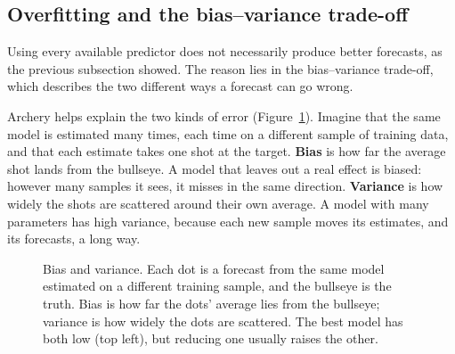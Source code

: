 \subsection{Overfitting and the bias--variance trade-off}
\label{sec:20-biasvar}

Using every available predictor does not necessarily produce better forecasts, as the previous subsection showed. The reason lies in the bias--variance trade-off, which describes the two different ways a forecast can go wrong.

Archery helps explain the two kinds of error (Figure~\ref{fig:20-targets}). Imagine that the same model is estimated many times, each time on a different sample of training data, and that each estimate takes one shot at the target. \textbf{Bias} is how far the average shot lands from the bullseye. A model that leaves out a real effect is biased: however many samples it sees, it misses in the same direction. \textbf{Variance} is how widely the shots are scattered around their own average. A model with many parameters has high variance, because each new sample moves its estimates, and its forecasts, a long way.

\begin{figure}[htbp]
  \centering
  \caption{Bias and variance. Each dot is a forecast from the same model
    estimated on a different training sample, and the bullseye is the truth.
    Bias is how far the dots' average lies from the bullseye; variance is how
    widely the dots are scattered. The best model has both low (top left), but
    reducing one usually raises the other.}
  \label{fig:20-targets}
\end{figure}

